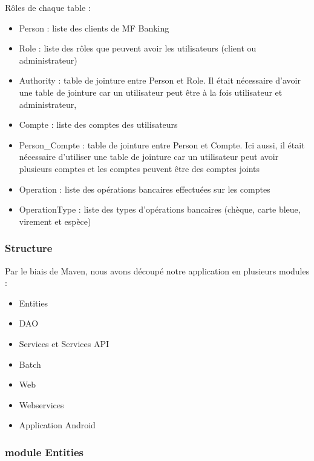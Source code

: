 Rôles de chaque table :
\begin{itemize}
	\item Person : liste des clients de MF Banking
	\item Role : liste des rôles que peuvent avoir les utilisateurs (client ou administrateur)
	\item Authority : table de jointure entre Person et Role. Il était nécessaire d'avoir une table de jointure car un utilisateur peut être à la fois utilisateur et administrateur,  
	\item Compte : liste des comptes des utilisateurs
	\item Person\_Compte : table de jointure entre Person et Compte. Ici aussi, il était nécessaire d'utiliser une table de jointure car un utilisateur peut avoir plusieurs comptes et les comptes peuvent \^etre des comptes joints
	\item Operation : liste des opérations bancaires effectuées sur les comptes
	\item OperationType : liste des types d'opérations bancaires (chèque, carte bleue, virement et espèce)
\end{itemize}
 \subsubsection{Structure}
Par le biais de Maven, nous avons découpé notre application en plusieurs modules :
\begin{itemize}
	\item Entities
	\item DAO
	\item Services et Services API
	\item Batch
	\item Web
	\item Webservices
	\item Application Android
\end{itemize}

\subsubsection*{module Entities}

